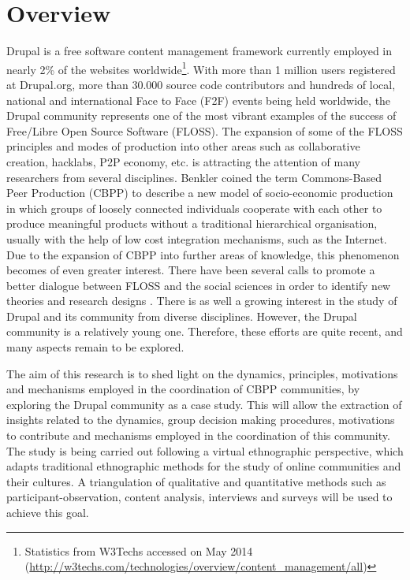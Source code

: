 \documentclass{acm_proc_article-sp}
\begin{document}
\section{Overview}
Drupal is a free software content management framework currently employed in nearly 2\% of the websites worldwide\footnote{Statistics from W3Techs accessed on May 2014 (\url{http://w3techs.com/technologies/overview/content_management/all})}.
  With more than 1 million users registered at Drupal.org, more than 30.000 source code contributors and hundreds of local, national and international Face to Face (F2F) events  being held worldwide, the Drupal community represents one of the most vibrant examples of the success of Free/Libre Open Source Software (FLOSS). The expansion of some of the FLOSS principles and modes of production into other areas such as collaborative creation, hacklabs, P2P economy, etc. is attracting the attention of many researchers from several disciplines. Benkler\cite{benkler2006wealth} coined the term Commons-Based Peer Production (CBPP) to describe a new model of socio-economic production in which groups of loosely connected individuals cooperate with each other to produce meaningful products without a traditional hierarchical organisation, usually with the help of low cost integration mechanisms, such as the Internet. Due to the expansion of CBPP into further areas of knowledge, this phenomenon becomes of even greater interest. There have been several calls to promote a better dialogue between FLOSS and the social sciences in order to identify new theories and research designs \cite{VonKrogh2007}. There is as well a growing interest in the study of Drupal and its community from diverse disciplines. However, the Drupal community is a relatively young one. Therefore, these efforts are quite recent, and many aspects remain to be explored.

The aim of this research is to shed light on the dynamics, principles, motivations and mechanisms employed in the coordination of CBPP communities, by exploring the Drupal community as a case study.  This  will allow the extraction of insights related to the dynamics, group decision making procedures, motivations to contribute and mechanisms employed in the coordination of this community. The study is being carried out following a virtual ethnographic perspective\cite{hine2000virtual}, which adapts traditional ethnographic methods for the study of online communities and their cultures. A triangulation of qualitative and quantitative methods such as participant-observation, content analysis, interviews and surveys will be used to achieve this goal.
\end{document}
